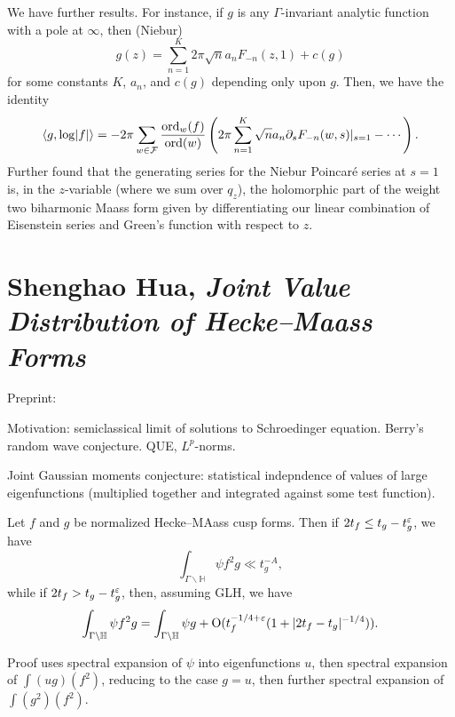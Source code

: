 \documentclass[reqno]{amsart} 
\begin{document}
We have further results.  For instance, if $g$ is any $\Gamma$-invariant analytic function with a pole at $\infty$, then (Niebur)
\begin{equation*}
  g(z) = \sum_{n = 1}^K 2 \pi \sqrt{n} a_n F_{- n}(z, 1) + c(g)
\end{equation*}
for some constants $K$, $a_n$, and $c(g)$ depending only upon $g$.  Then, we have the identity
\begin{equation*}
  \left\langle g, \log \lvert f \rvert \right\rangle
  = - 2 \pi \sum_{w \in \mathcal{F}} \frac{\operatorname{ord}_w(f)}{\operatorname{ord}(w)}
  \left( 2 \pi \sum_{n = 1}^K \sqrt{n } a_n \partial_s F_{- n}(w, s) |_{s=1} - \dotsb \right).
\end{equation*}
Further found that the generating series for the Niebur Poincar{\'e} series at $s = 1$ is, in the $z$-variable (where we sum over $q_z$), the holomorphic part of the weight two biharmonic Maass form given by differentiating our linear combination of Eisenstein series and Green's function with respect to $z$.


\section{Shenghao Hua, \textnormal{\emph{Joint Value Distribution of Hecke--Maass Forms}}}
Preprint: \cite{2024arXiv2405.00996}

Motivation: semiclassical limit of solutions to Schroedinger equation.  Berry's random wave conjecture.  QUE, $L^p$-norms.

Joint Gaussian moments conjecture: statistical indepndence of values of large eigenfunctions (multiplied together and integrated against some test function).

\begin{theorem}
  Let $f$ and $g$ be normalized Hecke--MAass cusp forms.  Then if $2 t_f \leq t_g - t_g^\varepsilon$, we have
  \begin{equation*}
    \int_{\Gamma \backslash \mathbb{H}}
    \psi f^2 g \ll t_g^{- A},
  \end{equation*}
  while if $2 t_f > t_g - t_g^\varepsilon$, then, assuming GLH, we have
  \begin{equation*}
    \int_{\Gamma \backslash \mathbb{H}} \psi f^2 g
    = \int_{\Gamma \backslash \mathbb{H}} \psi g +
    \operatorname{O}(t_f^{- 1/4 + \varepsilon}(1 + \lvert 2 t_f - t_g \rvert^{- 1/4})).
  \end{equation*}
\end{theorem}
Proof uses spectral expansion of $\psi$ into eigenfunctions $u$, then spectral expansion of $\int (u g)(f^2)$, reducing to the case $g=u$, then further spectral expansion of $\int(g^2)(f^2)$.
\end{document}
